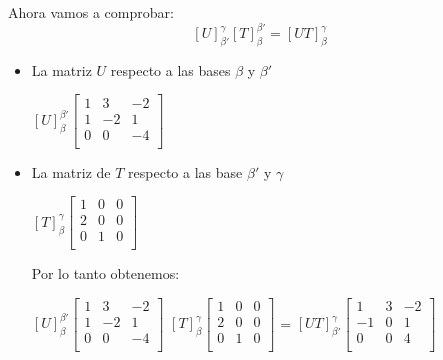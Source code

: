 \begin{itemize}
    Ahora vamos a comprobar:
    \begin{equation*}
        \left[ U \right]_{\beta'}^{\gamma} \left[ T \right]_{\beta}^{\beta'} = \left[ UT \right]_{\beta}^{\gamma}    
    \end{equation*}    
    \begin{itemize}
        \item La matriz $U$ respecto a las bases $\beta$ y $\beta'$
        \begin{center}            
            $ \left[ U \right]_{\beta}^{\beta'}
            \begin{bmatrix}
                1  &   3 & -2  \\
                1  &  -2 &  1  \\
                0  &   0 & -4  \\
            \end{bmatrix}      
            $
        \end{center}
            
        \item La matriz de $T$ respecto a las base $\beta'$ y $\gamma$ 
        \begin{center}            
            $ \left[ T \right]_{\beta}^{\gamma}
            \begin{bmatrix}
                1  &   0 &  0  \\
                2  &   0 &  0  \\
                0  &   1 &  0  \\
            \end{bmatrix}      
            $
        \end{center}

        Por lo tanto obtenemos:
        \begin{center}            
            $ \left[ U \right]_{\beta}^{\beta'}
            \begin{bmatrix}
                1  &   3 & -2  \\
                1  &  -2 &  1  \\
                0  &   0 & -4  \\
            \end{bmatrix}      
            $
            $ \left[ T \right]_{\beta}^{\gamma}
            \begin{bmatrix}
                1  &   0 &  0  \\
                2  &   0 &  0  \\
                0  &   1 &  0  \\
            \end{bmatrix}      
            $
            =
            $ \left[ UT \right]_{\beta'}^{\gamma}
            \begin{bmatrix}
                1  &  3 & -2  \\
               -1  &  0 &  1  \\
                0  &  0 &  4  \\
            \end{bmatrix}      
            $ 
        \end{center}
    \end{itemize}
\end{itemize}